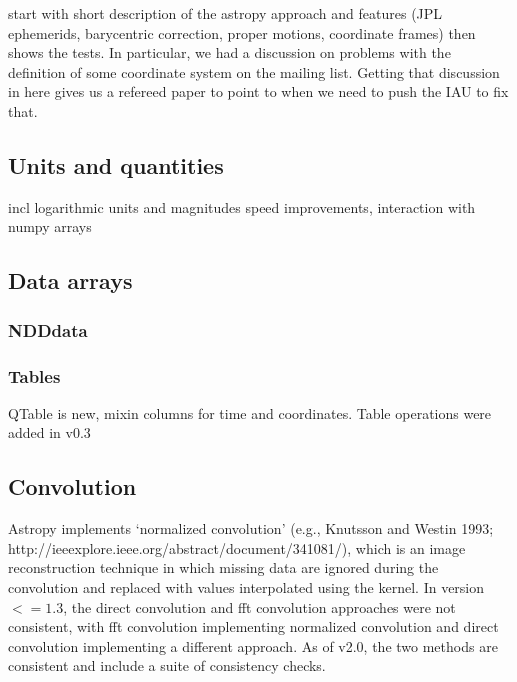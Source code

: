 \documentclass[modern]{aastex61}
\begin{document}
start with short description of the astropy approach and features (JPL ephemerids, barycentric correction, proper motions, coordinate frames) then shows the tests. In particular, we had a discussion on problems with the definition of some coordinate system on the mailing list. Getting that discussion in here gives us a refereed paper to point to when we need to push the IAU to fix that.

\subsection{Units and quantities}

incl logarithmic units and magnitudes
speed improvements,
interaction with numpy arrays

\subsection{Data arrays}

\subsubsection{NDDdata}

\subsubsection{Tables}
QTable is new, mixin columns for time and coordinates. Table operations were added in v0.3

\subsection{Convolution}
Astropy implements `normalized convolution' (e.g., Knutsson and Westin 1993; http://ieeexplore.ieee.org/abstract/document/341081/), which is an image reconstruction technique in which missing data are ignored during the convolution and replaced with values interpolated using the kernel.   In version $<=1.3$, the direct convolution and fft convolution approaches were not consistent, with fft convolution implementing normalized convolution and direct convolution implementing a different approach.  As of v2.0, the two methods are consistent and include a suite of consistency checks.
\end{document}
